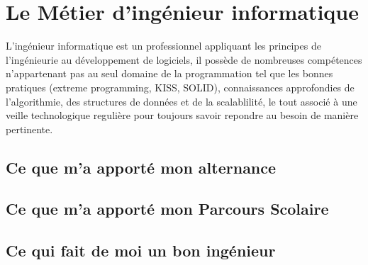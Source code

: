 \chapter{Le Métier d'ingénieur informatique}
L'ingénieur informatique est un professionnel appliquant les principes de l'ingénieurie au développement de logiciels,
il possède de nombreuses compétences n'appartenant pas au seul domaine de la programmation tel que les bonnes pratiques 
(extreme programming, KISS, SOLID), connaissances approfondies de l'algorithmie, des structures de données 
et de la scalablilité, le tout associé à une veille technologique regulière pour toujours savoir
repondre au besoin de manière pertinente.



\section{Ce que m'a apporté mon alternance}

\section{Ce que m'a apporté mon Parcours Scolaire}
\section{Ce qui fait de moi un bon ingénieur}